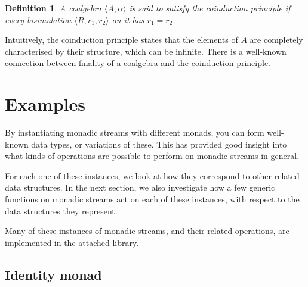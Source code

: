 \documentclass{article}
\newtheorem{definition}{Definition}
\begin{document}
\begin{definition}\label{def:coinduction}
A coalgebra $\langle A,\alpha\rangle$ is said to satisfy the {\em coinduction principle} if every bisimulation $\langle R,r_1,r_2\rangle$ on it has $r_1=r_2$.
\end{definition}

Intuitively, the coinduction principle states that the elements of $A$ are completely characterised by their structure, which can be infinite.
There is a well-known connection between finality of a coalgebra and the coinduction principle.











































\section{Examples}

By instantiating monadic streams with different monads, you can form well-known data types, or variations of these. This has provided good insight into what kinds of operations are possible to perform on monadic streams in general.

For each one of these instances, we look at how they correspond to other related data structures. In the next section, we also investigate how a few generic functions on monadic streams act on each of these instances, with respect to the data structures they represent.

Many of these instances of monadic streams, and their related operations, are implemented in the attached library.

\subsection{Identity monad}
\end{document}
